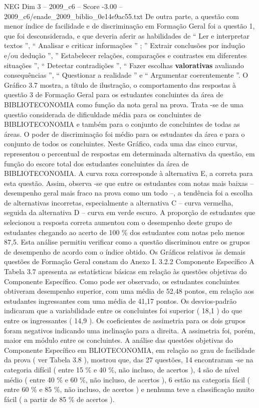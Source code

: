 \begin{textsample}{NEG Dim 3 – 2009\_c6 – Score -3.00 – 2009\_c6/enade\_2009\_biblio\_0e14e9ac55.txt}
De outra parte, a questão com menor índice de facilidade e de discriminação em Formação Geral foi a questão 1, que foi desconsiderada, e que deveria aferir as habilidades de “ Ler e interpretar textos ”, “ Analisar e criticar informações ” ; ” Extrair conclusões por indução e/ou dedução ”, ” Estabelecer relações, comparações e contrastes em diferentes situações ”, “ Detectar contradições ”, “ Fazer escolhas \textbf{valorativas} avaliando consequências ”, “ Questionar a realidade ” e “ Argumentar coerentemente ”.
O Gráfico 3.7 mostra, a título de ilustração, o comportamento das respostas à questão 3 de Formação Geral para os estudantes concluintes da área de BIBLIOTECONOMIA como função da nota geral na prova.
Trata -se de uma questão considerada de dificuldade média para os concluintes de BIBLIOTECONOMIA e também para o conjunto de concluintes de todas as áreas.
O poder de discriminação foi médio para os estudantes da área e para o conjunto de todos os concluintes.
Neste Gráfico, cada uma das cinco curvas, representou o percentual de respostas em determinada alternativa da questão, em função do escore total dos estudantes concluintes da área de BIBLIOTECONOMIA.
A curva roxa corresponde à alternativa E, a correta para esta questão.
Assim, observa -se que entre os estudantes com notas mais baixas – desempenho geral mais fraco na prova como um todo –, a tendência foi a escolha de alternativas incorretas, especialmente a alternativa C – curva vermelha, seguida da alternativa D – curva em verde escuro.
A proporção de estudantes que selecionou a resposta correta aumentou com o desempenho deste grupo de estudantes chegando ao acerto de 100 \% dos estudantes com notas pelo menos 87,5.
Esta análise permitiu verificar como a questão discriminou entre os grupos de desempenho de acordo com o índice obtido.
Os Gráficos relativos às demais questões de Formação Geral constam do Anexo I. 3.2.2 Componente Específico A Tabela 3.7 apresenta as estatísticas básicas em relação às questões objetivas do Componente Específico.
Como pode ser observado, os estudantes concluintes obtiveram desempenho superior, com uma média de 52,48 pontos, em relação aos estudantes ingressantes com uma média de 41,17 pontos.
Os desvios-padrão indicaram que a variabilidade entre os concluintes foi superior ( 18,1 ) do que entre os ingressantes ( 14,9 ).
Os coeficientes de assimetria para os dois grupos foram negativos indicando uma inclinação para a direita.
A assimetria foi, porém, maior em módulo entre os concluintes.
A análise das questões objetivas do Componente Específico em BLIOTECONOMIA, em relação ao grau de facilidade da prova ( ver Tabela 3.8 ), mostrou que, das 27 questões, 14 encontraram -se na categoria difícil ( entre 15 \% e 40 \%, não incluso, de acertos ), 4 são de nível médio ( entre 40 \% e 60 \%, não incluso, de acertos ), 6 estão na categoria fácil ( entre 60 \% e 85 \%, não incluso, de acertos ) e nenhuma teve a classificação muito fácil ( a partir de 85 \% de acertos ).

\end{textsample}
